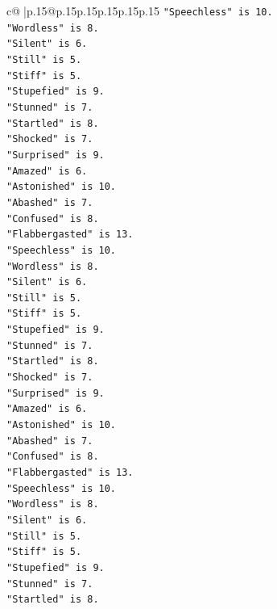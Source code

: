 \documentclass{article}
\begin{document}
{\begin{supertabular}{c@{$\;$}|p{.15\linewidth}@{}p{.15\linewidth}p{.15\linewidth}p{.15\linewidth}p{.15\linewidth}p{.15\linewidth}}
{{{\texttt{"Speechless" is 10.} \\
\texttt{"Wordless" is 8.} \\
\texttt{"Silent" is 6.} \\
\texttt{"Still" is 5.} \\
\texttt{"Stiff" is 5.} \\
\texttt{"Stupefied" is 9.} \\
\texttt{"Stunned" is 7.} \\
\texttt{"Startled" is 8.} \\
\texttt{"Shocked" is 7.} \\
\texttt{"Surprised" is 9.} \\
\texttt{"Amazed" is 6.} \\
\texttt{"Astonished" is 10.} \\
\texttt{"Abashed" is 7.} \\
\texttt{"Confused" is 8.} \\
\texttt{"Flabbergasted" is 13.} \\
\texttt{"Speechless" is 10.} \\
\texttt{"Wordless" is 8.} \\
\texttt{"Silent" is 6.} \\
\texttt{"Still" is 5.} \\
\texttt{"Stiff" is 5.} \\
\texttt{"Stupefied" is 9.} \\
\texttt{"Stunned" is 7.} \\
\texttt{"Startled" is 8.} \\
\texttt{"Shocked" is 7.} \\
\texttt{"Surprised" is 9.} \\
\texttt{"Amazed" is 6.} \\
\texttt{"Astonished" is 10.} \\
\texttt{"Abashed" is 7.} \\
\texttt{"Confused" is 8.} \\
\texttt{"Flabbergasted" is 13.} \\
\texttt{"Speechless" is 10.} \\
\texttt{"Wordless" is 8.} \\
\texttt{"Silent" is 6.} \\
\texttt{"Still" is 5.} \\
\texttt{"Stiff" is 5.} \\
\texttt{"Stupefied" is 9.} \\
\texttt{"Stunned" is 7.} \\
\texttt{"Startled" is 8.} \\
}}}
\end{supertabular}}
\end{document}

